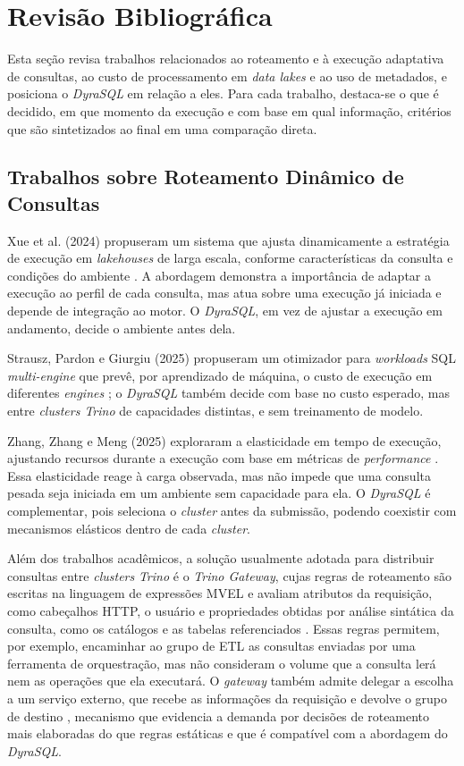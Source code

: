 \FloatBarrier
\section{Revisão Bibliográfica}
\label{sec:revisao-bibliografica}

Esta seção revisa trabalhos relacionados ao roteamento e à execução adaptativa de consultas, ao custo de processamento em \textit{data lakes} e ao uso de metadados, e posiciona o \textit{DyraSQL} em relação a eles. Para cada trabalho, destaca-se o que é decidido, em que momento da execução e com base em qual informação, critérios que são sintetizados ao final em uma comparação direta.

\subsection{Trabalhos sobre Roteamento Dinâmico de Consultas}

Xue et al. (2024) propuseram um sistema que ajusta dinamicamente a estratégia de execução em \textit{lakehouses} de larga escala, conforme características da consulta e condições do ambiente \cite{xue2024}. A abordagem demonstra a importância de adaptar a execução ao perfil de cada consulta, mas atua sobre uma execução já iniciada e depende de integração ao motor. O \textit{DyraSQL}, em vez de ajustar a execução em andamento, decide o ambiente antes dela.

Strausz, Pardon e Giurgiu (2025) propuseram um otimizador para \textit{workloads} SQL \textit{multi-engine} que prevê, por aprendizado de máquina, o custo de execução em diferentes \textit{engines} \cite{strausz2025}; o \textit{DyraSQL} também decide com base no custo esperado, mas entre \textit{clusters Trino} de capacidades distintas, e sem treinamento de modelo.

Zhang, Zhang e Meng (2025) exploraram a elasticidade em tempo de execução, ajustando recursos durante a execução com base em métricas de \textit{performance} \cite{zhang2025}. Essa elasticidade reage à carga observada, mas não impede que uma consulta pesada seja iniciada em um ambiente sem capacidade para ela. O \textit{DyraSQL} é complementar, pois seleciona o \textit{cluster} antes da submissão, podendo coexistir com mecanismos elásticos dentro de cada \textit{cluster}.

Além dos trabalhos acadêmicos, a solução usualmente adotada para distribuir consultas entre \textit{clusters} \textit{Trino} é o \textit{Trino Gateway}, cujas regras de roteamento são escritas na linguagem de expressões MVEL e avaliam atributos da requisição, como cabeçalhos HTTP, o usuário e propriedades obtidas por análise sintática da consulta, como os catálogos e as tabelas referenciados \cite{trinogateway}. Essas regras permitem, por exemplo, encaminhar ao grupo de ETL as consultas enviadas por uma ferramenta de orquestração, mas não consideram o volume que a consulta lerá nem as operações que ela executará. O \textit{gateway} também admite delegar a escolha a um serviço externo, que recebe as informações da requisição e devolve o grupo de destino \cite{trinogateway}, mecanismo que evidencia a demanda por decisões de roteamento mais elaboradas do que regras estáticas e que é compatível com a abordagem do \textit{DyraSQL}.

